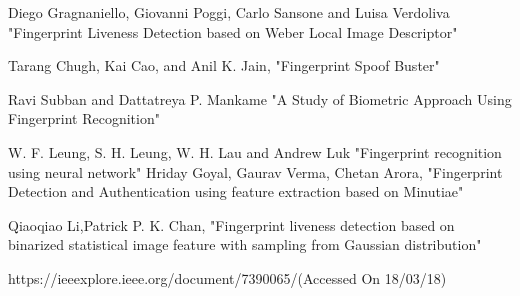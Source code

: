 \documentclass[a4paper,12pt,oneside]{article}
\begin{document}
\begin{thebibliography}{9}
Diego Gragnaniello, Giovanni Poggi, Carlo Sansone and Luisa Verdoliva {"Fingerprint Liveness Detection
based on Weber Local Image Descriptor"}


\bibitem Tarang Chugh, Kai Cao, and Anil K. Jain, {"Fingerprint Spoof Buster"}


\bibitem Ravi Subban and Dattatreya P. Mankame
{"A Study of Biometric Approach Using Fingerprint
Recognition"} 

\bibitem W. F. Leung, S. H. Leung, W. H. Lau and Andrew Luk  {"Fingerprint recognition using neural network"}
\bibitem
Hriday Goyal, Gaurav Verma, Chetan Arora, { "Fingerprint Detection and Authentication using feature extraction based on Minutiae" }

\bibitem  Qiaoqiao Li,Patrick P. K. Chan, {"Fingerprint liveness detection based on binarized statistical image feature with sampling from Gaussian distribution"}

https://ieeexplore.ieee.org/document/7390065/(Accessed On 18/03/18)



\end{thebibliography}
\end{document}
